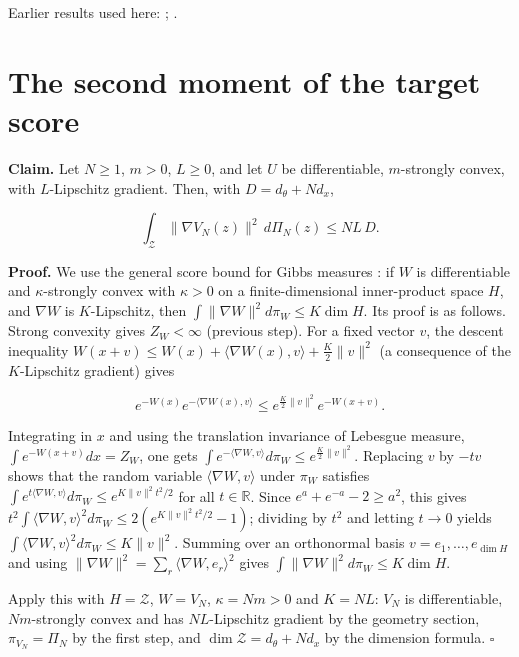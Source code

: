 \documentclass[11pt,a4paper]{article}
\begin{document}
Earlier results used here: \cite[Section~3.17.3]{LangevinLean2026ULASC}; \cite[Section~3.21.4]{LangevinLean2026ULASC}.

\section{\texorpdfstring{The second moment of the target score}{The second moment of the target score}}


\textbf{Claim.} Let \(N\ge1\), \(m>0\), \(L\ge0\), and let \(U\) be differentiable, \(m\)-strongly convex, with \(L\)-Lipschitz gradient. Then, with \(D=d_\theta+Nd_x\),


\[\int_{\mathcal Z}\|\nabla V_N(z)\|^2\,d\Pi_N(z)\le NL\,D .\]


\textbf{Proof.} We use the general score bound for Gibbs measures \cite[Section~3.27.8]{LangevinLean2026ULASC}: if \(W\) is differentiable and \(\kappa\)-strongly convex with \(\kappa>0\) on a finite-dimensional inner-product space \(H\), and \(\nabla W\) is \(K\)-Lipschitz, then \(\int\|\nabla W\|^2d\pi_W\le K\dim H\). Its proof is as follows. Strong convexity gives \(Z_W<\infty\) (previous step). For a fixed vector \(v\), the descent inequality \(W(x+v)\le W(x)+\langle\nabla W(x),v\rangle+\frac K2\|v\|^2\) (a consequence of the \(K\)-Lipschitz gradient) gives


\[e^{-W(x)}e^{-\langle\nabla W(x),v\rangle}\le e^{\frac K2\|v\|^2}e^{-W(x+v)} .\]


Integrating in \(x\) and using the translation invariance of Lebesgue measure, \(\int e^{-W(x+v)}dx=Z_W\), one gets \(\int e^{-\langle\nabla W,v\rangle}d\pi_W\le e^{\frac K2\|v\|^2}\). Replacing \(v\) by \(-tv\) shows that the random variable \(\langle\nabla W,v\rangle\) under \(\pi_W\) satisfies \(\int e^{t\langle\nabla W,v\rangle}d\pi_W\le e^{K\|v\|^2t^2/2}\) for all \(t\in\mathbb R\). Since \(e^a+e^{-a}-2\ge a^2\), this gives \(t^2\int\langle\nabla W,v\rangle^2d\pi_W\le2(e^{K\|v\|^2t^2/2}-1)\); dividing by \(t^2\) and letting \(t\to0\) yields \(\int\langle\nabla W,v\rangle^2d\pi_W\le K\|v\|^2\). Summing over an orthonormal basis \(v=e_1,\dots,e_{\dim H}\) and using \(\|\nabla W\|^2=\sum_r\langle\nabla W,e_r\rangle^2\) gives \(\int\|\nabla W\|^2d\pi_W\le K\dim H\).




Apply this with \(H=\mathcal Z\), \(W=V_N\), \(\kappa=Nm>0\) and \(K=NL\): \(V_N\) is differentiable, \(Nm\)-strongly convex and has \(NL\)-Lipschitz gradient by the geometry section, \(\pi_{V_N}=\Pi_N\) by the first step, and \(\dim\mathcal Z=d_\theta+Nd_x\) by the dimension formula. \(\square\)
\end{document}
